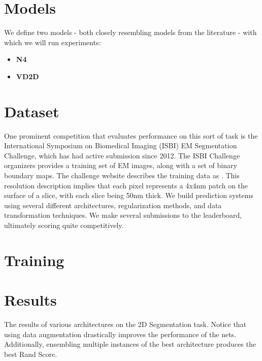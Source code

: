 \section{Models}

We define two models - both closely resembling models from the literature -  with which we will run experiments:

\begin{itemize}
\item \textbf{N4}
\item \textbf{VD2D}
\end{itemize}

\section{Dataset}


One prominent competition that evaluates performance on this sort of task is the International Symposium on Biomedical Imaging (ISBI) EM Segmentation Challenge, which has had active submission since 2012. The ISBI Challenge organizers provides a training set of EM images, along with a set of binary boundary maps. The challenge website describes the training data as \cite{Arganda-Carreras2015}. This resolution description implies that each pixel represents a 4x4nm patch on the surface of a slice, with each slice being 50nm thick. We build prediction systems using several different architectures, regularization methods, and data transformation techniques. We make several submissions to the leaderboard, ultimately scoring quite competitively.

\section{Training}

\section{Results}

\begin{table}
\centering
	
	\caption[Results of 2D Segmentation]{The results of various architectures on the 2D Segmentation task. Notice that using data augmentation drastically improves the performance of the nets. Additionally, ensembling multiple instances of the best architecture produces the best Rand Score.}
	\label{tab:2d_results}
\end{table}

